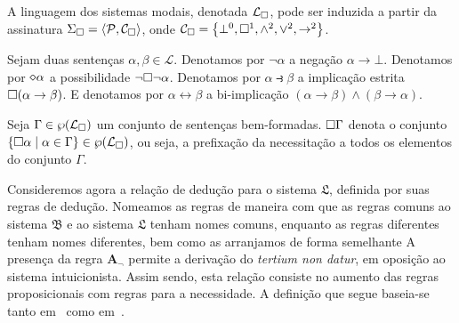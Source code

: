     \vspace{\baselineskip}
    \begin{tcolorbox}[enhanced jigsaw, breakable, sharp corners, colframe=black, colback=white, boxrule=0.5pt, left=1.5mm, right=1.5mm, top=1.5mm, bottom=1.5mm]
    \begin{definition}\label{modal.language}
        A linguagem dos sistemas modais, denotada $\mathcal{L}_{\Box}$, pode ser induzida a partir da assinatura $\Sigma_{\Box}=\langle\mathcal{P},\mathcal{C}_{\Box}\rangle$, onde $\mathcal{C}_{\Box}=\left\{\bot^0,\Box^1,\wedge^2,\vee^2,\to^2\right\}$.
    \end{definition}
    \end{tcolorbox}

    \begin{tcolorbox}[enhanced jigsaw, breakable, sharp corners, colframe=black, colback=white, boxrule=0.5pt, left=1.5mm, right=1.5mm, top=1.5mm, bottom=1.5mm]
    \begin{notation}
        Sejam duas sentenças $\alpha,\beta\in\mathcal{L}$.
        Denotamos por $\neg\alpha$ a negação $\alpha\to\bot$.
        Denotamos por $\pos\alpha$ a possibilidade $\neg\Box\neg\alpha$.
        Denotamos por $\alpha\strictif\beta$ a implicação estrita $\Box(\alpha\to\beta)$.
        E denotamos por $\alpha\leftrightarrow\beta$ a bi-implicação $(\alpha\to\beta)\wedge(\beta\to\alpha)$.
    \end{notation}
    \end{tcolorbox}

    \begin{tcolorbox}[enhanced jigsaw, breakable, sharp corners, colframe=black, colback=white, boxrule=0.5pt, left=1.5mm, right=1.5mm, top=1.5mm, bottom=1.5mm]
    \begin{notation}
        Seja $\Gamma\in\wp(\mathcal{L}_{\Box})$ um conjunto de sentenças bem-formadas.
        $\Box\Gamma$ denota o conjunto $\left\{\Box\alpha\mid\alpha\in\Gamma\right\}\in\wp(\mathcal{L}_{\Box})$, ou seja, a prefixação da necessitação a todos os elementos do conjunto $\Gamma$.
    \end{notation}
    \end{tcolorbox}

\vspace{.5\baselineskip}
    Consideremos agora a relação de dedução para o sistema $\mathfrak{L}$, definida por suas regras de dedução.
    Nomeamos as regras de maneira com que as regras comuns ao sistema $\mathfrak{B}$ e ao sistema $\mathfrak{L}$ tenham nomes comuns, enquanto as regras diferentes tenham nomes diferentes, bem como as arranjamos de forma semelhante
    A presença da regra $\mathbf{A_\neg}$ permite a derivação do \emph{tertium non datur}, em oposição ao sistema intuicionista.
    Assim sendo, esta relação consiste no aumento das regras proposicionais com regras para a necessidade.
    A definição que segue baseia-se tanto em~\cite{Troelstra} como em~\cite{Hakli}.

